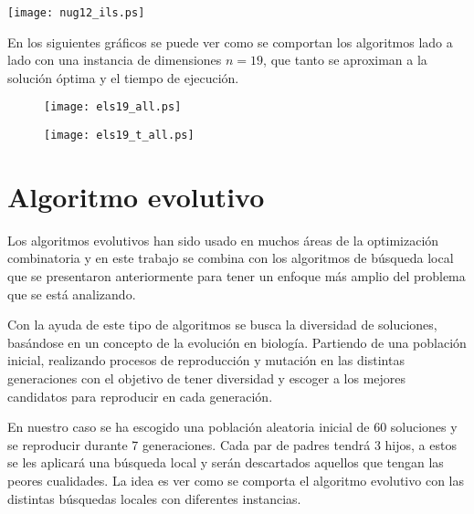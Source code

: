 \begin{center}
    \texttt{[image: nug12\_ils.ps]}
\end{center}

\newpage

En los siguientes gráficos se puede ver como se comportan los algoritmos lado a lado con una instancia de dimensiones $n=19$, que tanto se aproximan a la solución óptima y el tiempo de ejecución.

\begin{figure}[h]
    \centering
    \begin{minipage}{0.5\textwidth}
        \centering
        \texttt{[image: els19\_all.ps]} %
    \end{minipage}\hfill
    \begin{minipage}{0.5\textwidth}
        \centering
        \texttt{[image: els19\_t\_all.ps]} %
    \end{minipage}
\end{figure}

\section*{Algoritmo evolutivo}

Los algoritmos evolutivos han sido usado en muchos áreas de la optimización combinatoria\cite{evo:07:cec} y en este trabajo se combina con los algoritmos de búsqueda local que se presentaron anteriormente para tener un enfoque más amplio del problema que se está analizando.

Con la ayuda de este tipo de algoritmos se busca la diversidad de soluciones, basándose en un concepto de la evolución en biología. Partiendo de una población inicial, realizando procesos de reproducción y mutación en las distintas generaciones con el objetivo de tener diversidad y escoger a los mejores candidatos para reproducir en cada generación.

En nuestro caso se ha escogido una población aleatoria inicial de 60 soluciones y se reproducir durante 7 generaciones. Cada par de padres tendrá 3 hijos, a estos se les aplicará una búsqueda local y serán descartados aquellos que tengan las peores cualidades. La idea es ver como se comporta el algoritmo evolutivo con las distintas búsquedas locales con diferentes instancias.

